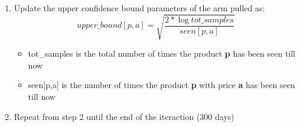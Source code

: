 \begin{enumerate}
\begin{itemize}
        \end{itemize}
    \item Update the upper confidence bound parameters of the arm pulled as:
        \begin{equation}
            upper\_bound[p,a] = \sqrt{\frac{2 * \log tot\_samples}{seen[p,a]}}
        \end{equation}
        \begin{itemize}
            \item tot\_samples is the total number of times the product {\bf p} has been seen till now
            \item seen[p,a] is the number of times the product {\bf p} with price {\bf a} has been seen  till now 
        \end{itemize}
    \item Repeat from step 2 until the end of the iteraction (300 days)
\end{enumerate}
